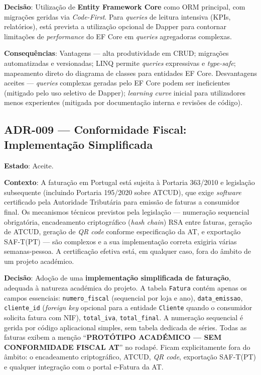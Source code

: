 \noindent\textbf{Decisão}: Utilização de \textbf{Entity Framework Core} como ORM principal, com migrações geridas via \textit{Code-First}. Para \textit{queries} de leitura intensiva (KPIs, relatórios), está prevista a utilização opcional de Dapper para contornar limitações de \textit{performance} do EF Core em \textit{queries} agregadoras complexas.

\noindent\textbf{Consequências}: Vantagens --- alta produtividade em CRUD; migrações automatizadas e versionadas; LINQ permite \textit{queries} expressivas e \textit{type-safe}; mapeamento direto do diagrama de classes para entidades EF Core. Desvantagens aceites --- \textit{queries} complexas geradas pelo EF Core podem ser ineficientes (mitigado pelo uso seletivo de Dapper); \textit{learning curve} inicial para utilizadores menos experientes (mitigada por documentação interna e revisões de código).

\subsection*{ADR-009 --- Conformidade Fiscal: Implementação Simplificada}

\noindent\textbf{Estado}: Aceite.

\noindent\textbf{Contexto}: A faturação em Portugal está sujeita à Portaria 363/2010 e legislação subsequente (incluindo Portaria 195/2020 sobre ATCUD), que exige \textit{software} certificado pela Autoridade Tributária para emissão de faturas a consumidor final. Os mecanismos técnicos previstos pela legislação --- numeração sequencial obrigatória, encadeamento criptográfico (\textit{hash chain}) RSA entre faturas, geração de ATCUD, geração de \textit{QR code} conforme especificação da AT, e exportação SAF-T(PT) --- são complexos e a sua implementação correta exigiria várias semanas-pessoa. A certificação efetiva está, em qualquer caso, fora do âmbito de um projeto académico.

\noindent\textbf{Decisão}: Adoção de uma \textbf{implementação simplificada de faturação}, adequada à natureza académica do projeto. A tabela \texttt{Fatura} contém apenas os campos essenciais: \texttt{numero\_fiscal} (sequencial por loja e ano), \texttt{data\_emissao}, \texttt{cliente\_id} (\textit{foreign key} opcional para a entidade \texttt{Cliente} quando o consumidor solicita fatura com NIF), \texttt{total\_iva}, \texttt{total\_final}. A numeração sequencial é gerida por código aplicacional simples, sem tabela dedicada de séries. Todas as faturas exibem a menção ``\textbf{PROTÓTIPO ACADÉMICO --- SEM CONFORMIDADE FISCAL AT}'' no rodapé. Ficam explicitamente fora do âmbito: o encadeamento criptográfico, ATCUD, \textit{QR code}, exportação SAF-T(PT) e qualquer integração com o portal e-Fatura da AT.


